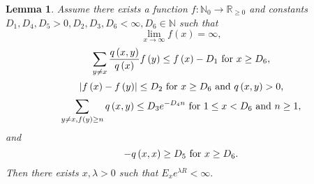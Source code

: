 \documentclass[12pt,a4paper]{scrartcl}
\newtheorem{lemma}[theorem]{Lemma}
\numberwithin{equation}{section}
\newcommand{\R}{\mathbb{R}} %
\newcommand{\N}{\mathbb{N}} %
\begin{document}
\begin{lemma} \label{equivalentconditioneasierverified}
Assume there exists a function $f: \N_0 \to \R_{\geq 0}$ and constants $D_1, D_4, D_5 > 0, D_2, D_3, D_6 < \infty, D_6 \in \N$ such that
\begin{equation}
\lim_{x \to \infty} f\left(x\right) = \infty,
\end{equation} 
\begin{equation} \label{eq:secondD}
\sum_{y \neq x} \frac{q\left(x,y\right)}{q\left(x\right)} f\left(y\right) \leq f\left(x\right) - D_1 \textnormal{ for } x \geq D_6,
\end{equation}
\begin{equation} \label{eq:thirdD}
\left|f\left(x\right) - f\left(y\right) \right| \leq D_2 \textnormal{ for } x \geq D_6 \textnormal{ and } q\left(x,y\right) > 0,
\end{equation}
\begin{equation} \label{eq:fourthD}
\sum_{y \neq x, f\left(y\right) \geq n} q\left(x,y\right) \leq D_3 e^{-D_4 n} \textnormal{ for } 1\leq x < D_6 \textnormal{ and } n \geq 1,
\end{equation}
and
\begin{equation}
-q\left(x,x\right) \geq D_5 \textnormal{ for } x \geq D_6.
\end{equation}
Then there exists $x, \lambda > 0$ such that $E_x e^{\lambda R} < \infty.$
\end{lemma}
\end{document}
